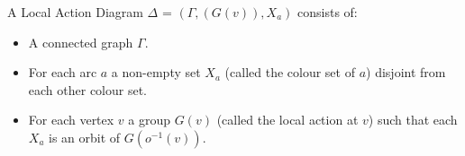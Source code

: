 \documentclass[preview]{standalone}
\begin{document}
\begin{center}
A Local Action Diagram $\Delta$ = $(\Gamma, (G(v)), X_{a})$ consists of: \begin{itemize}\item A connected graph $\Gamma$.\item For each arc $a$ a non-empty set $X_a$ (called the colour set of $a$) disjoint from each other colour set.\item For each vertex $v$ a group $G(v)$ (called the local action at $v$) such that each $X_a$ is an orbit of $G(o^{-1}(v))$.\end{itemize}
\end{center}
\end{document}

